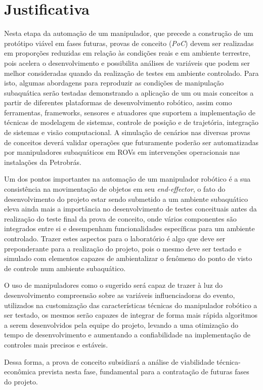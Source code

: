 \section{Justificativa}
\label{sec:just}
Nesta etapa da automação de um manipulador, que precede a construção de um protótipo viável em fases futuras, provas de conceito (\textit{\acs{PoC}}) devem ser realizadas em proporções reduzidas em relação às condições reais e em ambiente terrestre, pois acelera o desenvolvimento e possibilita análises de variáveis que podem ser melhor consideradas quando da realização de testes em ambiente controlado. Para isto, algumas abordagens para reproduzir as condições de manipulação subaquática serão testadas demonstrando a aplicação de um ou mais conceitos a partir de diferentes plataformas de desenvolvimento robótico, assim como ferramentas, frameworks, sensores e atuadores que suportem a implementação de técnicas de modelagem de sistemas, controle de posição e de trajetória, integração de sistemas e visão computacional.
A simulação de cenários nas diversas provas de conceitos deverá validar operações que futuramente poderão ser automatizadas por manipuladores subaquáticos em ROVs em intervenções operacionais nas instalações da Petrobrás. 

Um dos pontos importantes na automação de um manipulador robótico é a sua consistência na movimentação de objetos em seu \textit{end-effector}, o fato do desenvolvimento do projeto estar sendo submetido a um ambiente subaquático eleva ainda mais a importância no desenvolvimento de testes conceituais antes da realização do teste final da prova de conceito, onde vários componentes são integrados entre si e desempenham funcionalidades específicas para um ambiente controlado. Trazer estes aspectos para o laboratório é algo que deve ser preponderante para a realização do projeto, pois o mesmo deve ser testado e simulado com elementos capazes de ambientalizar o fenômeno do ponto de visto de controle num ambiente subaquático.

O uso de manipuladores como o sugerido será capaz de trazer à luz do desenvolvimento compreensão sobre as variáveis influenciadoras do evento, utilizados na customização das características técnicas do manipulador robótico a ser testado, os mesmos serão capazes de integrar de forma mais rápida algoritmos a serem desenvolvidos pela equipe do projeto, levando a uma otimização do tempo de desenvolvimento e aumentando a confiabilidade na implementação de controles mais precisos e estáveis.

Dessa forma, a prova de conceito subsidiará a análise de viabilidade técnica-econômica prevista nesta fase, fundamental para a contratação de futuras fases do projeto.

